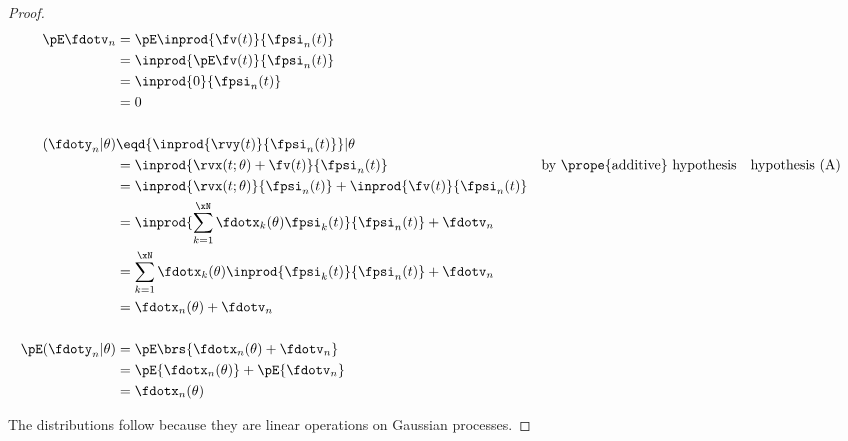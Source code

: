 \begin{proof}
\begin{align*}
   \pE\fdotv_{n}
     &= \pE\inprod{\fv(t)}{\fpsi_n(t)}
   \\&= \inprod{\pE\fv(t)}{\fpsi_n(t)}
   \\&= \inprod{0}{\fpsi_n(t)}
   \\&= 0
\\
\\
   (\fdoty_n |\theta)
     &\eqd {\inprod{\rvy(t)}{\fpsi_n(t)}}  |\theta
   \\&=    {\inprod{\rvx(t;\theta)+\fv(t)}{\fpsi_n(t)}}
     && \text{by \prope{additive} hypothesis}
     && \text{hypothesis (A)}
   \\&=    {\inprod{\rvx(t;\theta)}{\fpsi_n(t)}} +   {\inprod{\fv(t)}{\fpsi_n(t)}}
   \\&=    \inprod{\sum_{k=1}^\xN \fdotx_k(\theta) \fpsi_k(t)}{\fpsi_n(t)} + \fdotv_n
   \\&=    \sum_{k=1}^\xN \fdotx_k(\theta) \inprod{\fpsi_k(t)}{\fpsi_n(t)} + \fdotv_n
   \\&=    \fdotx_n(\theta)  + \fdotv_n
\\ \\
   \pE({\fdoty_n} | \theta)
     &= \pE\brs{\fdotx_n(\theta)  + \fdotv_n}
   \\&= \pE{\fdotx_n(\theta) } +   \pE{\fdotv_n}
   \\&= \fdotx_n(\theta)
\end{align*}

The distributions follow because they are linear operations on
Gaussian processes.
\end{proof}

